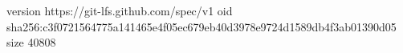 version https://git-lfs.github.com/spec/v1
oid sha256:c3f0721564775a141465e4f05ec679eb40d3978e9724d1589db4f3ab01390d05
size 40808
